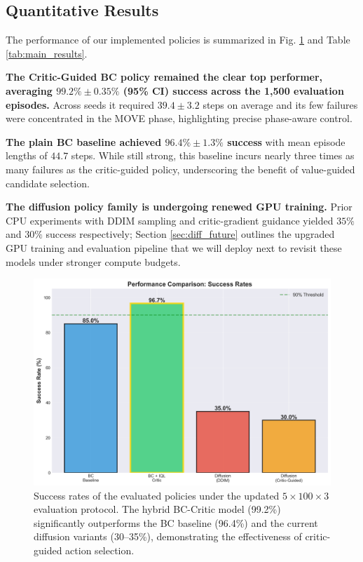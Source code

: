 \documentclass[conference]{IEEEtran}
\begin{document}
\subsection{Quantitative Results}
The performance of our implemented policies is summarized in Fig. \ref{fig:results_chart} and Table \ref{tab:main_results}.

\textbf{The Critic-Guided BC policy remained the clear top performer, averaging $99.2\% \pm 0.35\%$ (95\% CI) success across the 1,500 evaluation episodes.} Across seeds it required $39.4 \pm 3.2$ steps on average and its few failures were concentrated in the MOVE phase, highlighting precise phase-aware control.

\textbf{The plain BC baseline achieved $96.4\% \pm 1.3\%$ success} with mean episode lengths of $44.7$ steps. While still strong, this baseline incurs nearly three times as many failures as the critic-guided policy, underscoring the benefit of value-guided candidate selection.

\textbf{The diffusion policy family is undergoing renewed GPU training.} Prior CPU experiments with DDIM sampling and critic-gradient guidance yielded $35\%$ and $30\%$ success respectively; Section \ref{sec:diff_future} outlines the upgraded GPU training and evaluation pipeline that we will deploy next to revisit these models under stronger compute budgets.

\begin{figure}[t]
\centering
\includegraphics[width=\columnwidth]{success_rate_comparison.png}
\caption{Success rates of the evaluated policies under the updated $5\times100\times3$ evaluation protocol. The hybrid BC-Critic model (99.2\%) significantly outperforms the BC baseline (96.4\%) and the current diffusion variants (30--35\%), demonstrating the effectiveness of critic-guided action selection.}
\label{fig:results_chart}
\end{figure}
\end{document}
